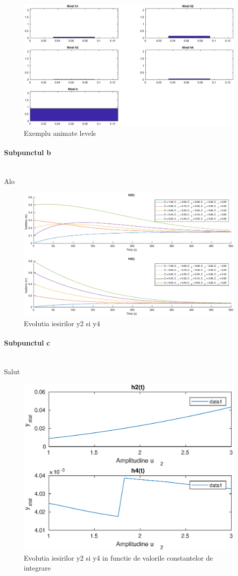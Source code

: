 \documentclass[12pt,english]{article}
\newcommand{\myparagraph}[1]{\paragraph{#1}\mbox{}\\}
\begin{document}
\begin{figure} [H]
	\includegraphics[width=1\textwidth]{a_1.eps}
	\caption{Exemplu animate levels}
\end{figure}

\myparagraph {Subpunctul b}
Alo

\begin{figure} [H]
	\includegraphics[width=1\textwidth]{b_1.eps}
	\caption{Evolutia iesirilor y2 si y4}
\end{figure}

\myparagraph {Subpunctul c}
Salut

\begin{figure} [H]
	\includegraphics[width=1\textwidth]{c_1.eps}
	\caption{Evolutia iesirilor y2 si y4 in functie de valorile constantelor de integrare}
\end{figure}
\end{document}
